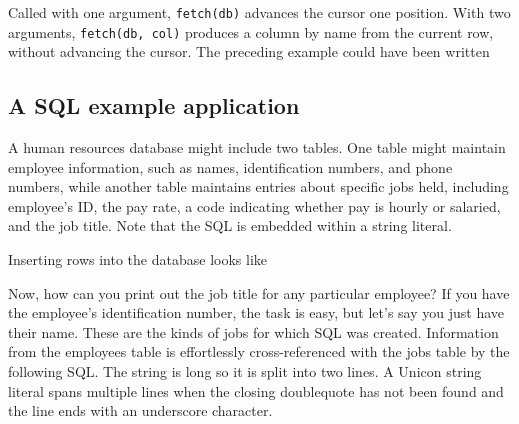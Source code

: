 
\noindent
Called with one argument, \texttt{fetch(db)} advances the cursor
one position. With two arguments, \texttt{fetch(db, col)} produces a
column by name from the current row, without advancing the cursor.
The preceding example could have been written


\subsection*{A SQL example application}

A human resources database might include two tables. One
table might maintain employee information, such as names,
identification numbers, and phone numbers, while another table
maintains entries about specific jobs held, including
employee's ID, the pay rate, a code indicating whether
pay is hourly or salaried, and the job title. Note that the SQL is
embedded within a string literal.


\noindent
Inserting rows into the database looks like


Now, how can you print out the job title for any particular employee? If
you have the employee's identification number, the
task is easy, but let's say you just have their name.
These are the kinds of jobs for which SQL was created. Information from
the employees table is effortlessly cross-referenced with the jobs
table by the following SQL. The string is long so it is split into
two lines. A Unicon string literal spans multiple lines when the
closing doublequote has not been found and the line ends with an
underscore character.


